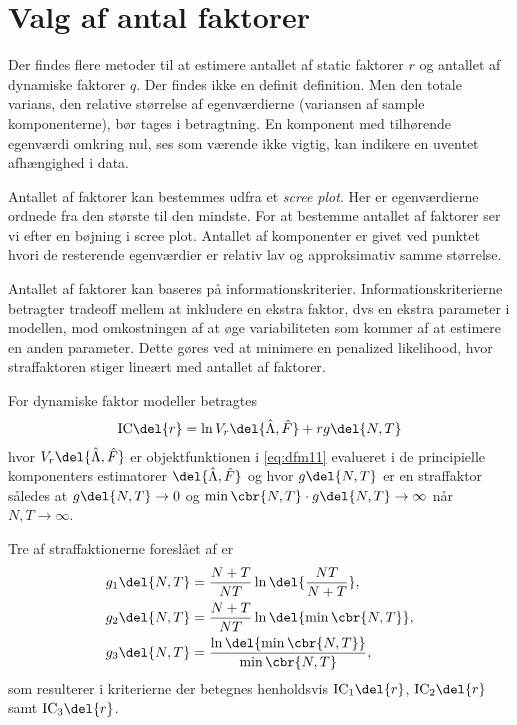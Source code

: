\section{Valg af antal faktorer}
Der findes flere metoder til at estimere antallet af static faktorer $r$ og antallet af dynamiske faktorer $q$.
Der findes ikke en definit definition.
Men den totale varians, den relative størrelse af egenværdierne (variansen af sample komponenterne), bør tages i betragtning.
En komponent med tilhørende egenværdi omkring nul, ses som værende ikke vigtig, kan indikere en uventet afhængighed i data.





Antallet af faktorer kan bestemmes udfra et \textit{scree plot}.
Her er egenværdierne ordnede fra den største til den mindste.
For at bestemme antallet af faktorer ser vi efter en bøjning i scree plot.
Antallet af komponenter er givet ved punktet hvori de resterende egenværdier er relativ lav og approksimativ samme størrelse.

Antallet af faktorer kan baseres på informationskriterier.
\citep{Bai_Ng} 
Informationskriterierne betragter tradeoff mellem at inkludere en ekstra faktor, dvs en ekstra parameter i modellen, mod omkostningen af at øge variabiliteten som kommer af at estimere en anden parameter.
Dette gøres ved at minimere en penalized likelihood, hvor straffaktoren stiger lineært med antallet af faktorer.

For dynamiske faktor modeller betragtes
\begin{align*}
\text{IC} \del{r} = \ln V_r \del{\hat{\Lambda}, \hat{F}} + r g \del{N,T}
\end{align*}
hvor \(V_r \del{\hat{\Lambda}, \hat{F}}\) er objektfunktionen i \eqref{eq:dfm11} evalueret i de principielle komponenters estimatorer \(\del{\hat{\Lambda}, \hat{F}}\) og hvor \(g \del{N,T}\) er en straffaktor således at \(g \del{N,T} \rightarrow 0\) og \(\min \cbr{N, T} \cdot g \del{N,T} \rightarrow \infty\) når \(N, T \rightarrow \infty\).

Tre af straffaktionerne foreslået af \citep{Bai_Ng} er
\begin{align*}
g_1 \del{N,T} &= \frac{N + T}{N T} \ln \del{\frac{NT}{N + T}}, \\
g_2 \del{N,T} &= \frac{N + T}{N T} \ln \del{ \min \cbr{N, T}}, \\
g_3 \del{N,T} &= \frac{\ln \del{\min \cbr{N, T}}}{\min \cbr{N, T}},
\end{align*}
som resulterer i kriterierne der betegnes henholdsvis \(\text{IC}_1 \del{r}\), \(\text{IC}_2 \del{r}\) samt \(\text{IC}_3 \del{r}\).

